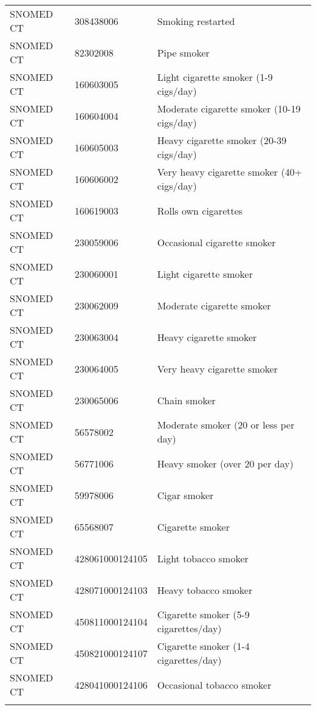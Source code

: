\begin{longtable}{p{}p{}p{}}
  SNOMED CT & 308438006 & Smoking restarted \\ 
  SNOMED CT & 82302008 & Pipe smoker \\ 
  SNOMED CT & 160603005 & Light cigarette smoker (1-9 cigs/day) \\ 
  SNOMED CT & 160604004 & Moderate cigarette smoker (10-19 cigs/day) \\ 
  SNOMED CT & 160605003 & Heavy cigarette smoker (20-39 cigs/day) \\ 
  SNOMED CT & 160606002 & Very heavy cigarette smoker (40+ cigs/day) \\ 
  SNOMED CT & 160619003 & Rolls own cigarettes \\ 
  SNOMED CT & 230059006 & Occasional cigarette smoker \\ 
  SNOMED CT & 230060001 & Light cigarette smoker \\ 
  SNOMED CT & 230062009 & Moderate cigarette smoker \\ 
  SNOMED CT & 230063004 & Heavy cigarette smoker \\ 
  SNOMED CT & 230064005 & Very heavy cigarette smoker \\ 
  SNOMED CT & 230065006 & Chain smoker \\ 
  SNOMED CT & 56578002 & Moderate smoker (20 or less per day) \\ 
  SNOMED CT & 56771006 & Heavy smoker (over 20 per day) \\ 
  SNOMED CT & 59978006 & Cigar smoker \\ 
  SNOMED CT & 65568007 & Cigarette smoker \\ 
  SNOMED CT & 428061000124105 & Light tobacco smoker \\ 
  SNOMED CT & 428071000124103 & Heavy tobacco smoker \\ 
  SNOMED CT & 450811000124104 & Cigarette smoker (5-9 cigarettes/day) \\ 
  SNOMED CT & 450821000124107 & Cigarette smoker (1-4 cigarettes/day) \\ 
  SNOMED CT & 428041000124106 & Occasional tobacco smoker \\ 
  \hline
\label{tab:codes_smoking}
\end{longtable}
